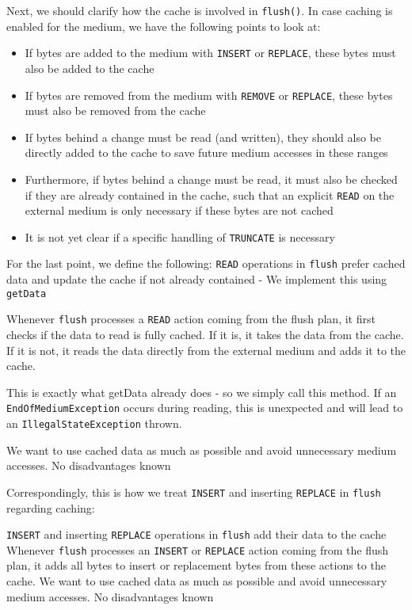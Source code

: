 Next, we should clarify how the cache is involved in \texttt{flush()}. In case caching is enabled for the medium, we have the following points to look at:
\begin{itemize}
\item If bytes are added to the medium with \texttt{INSERT} or \texttt{REPLACE}, these bytes must also be added to the cache
\item If bytes are removed from the medium with \texttt{REMOVE} or \texttt{REPLACE}, these bytes must also be removed from the cache
\item If bytes behind a change must be read (and written), they should also be directly added to the cache to save future medium accesses in these ranges
\item Furthermore, if bytes behind a change must be read, it must also be checked if they are already contained in the cache, such that an explicit \texttt{READ} on the external medium is only necessary if these bytes are not cached
\item It is not yet clear if a specific handling of \texttt{TRUNCATE} is necessary
\end{itemize}

For the last point, we define the following:
{%
\texttt{READ} operations in \texttt{flush} prefer cached data and update the cache if not already contained - We implement this using \texttt{getData}
}
{%
Whenever \texttt{flush} processes a \texttt{READ} action coming from the flush plan, it first checks if the data to read is fully cached. If it is, it takes the data from the cache. If it is not, it reads the data directly from the external medium and adds it to the cache.

This is exactly what getData already does - so we simply call this method. If an \texttt{EndOfMediumException} occurs during reading, this is unexpected and will lead to an \texttt{IllegalStateException} thrown.
}
{%
We want to use cached data as much as possible and avoid unnecessary medium accesses.
}
{%
No disadvantages known
}

Correspondingly, this is how we treat \texttt{INSERT} and inserting \texttt{REPLACE} in \texttt{flush} regarding caching:

{%
\texttt{INSERT} and inserting \texttt{REPLACE} operations in \texttt{flush} add their data to the cache
}
{%
Whenever \texttt{flush} processes an \texttt{INSERT} or \texttt{REPLACE} action coming from the flush plan, it adds all bytes to insert or replacement bytes from these actions to the cache.
}
{%
We want to use cached data as much as possible and avoid unnecessary medium accesses.
}
{%
No disadvantages known
}

